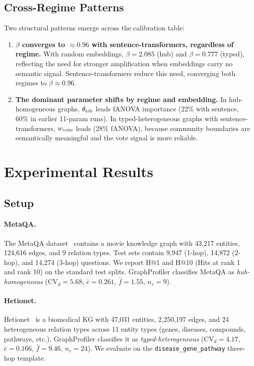 \documentclass[11pt,a4paper]{article}
\begin{document}
\subsection{Cross-Regime Patterns}

Two structural patterns emerge across the calibration table:

\begin{enumerate}
  \item \textbf{$\beta$ converges to $\approx 0.96$ with sentence-transformers,
    regardless of regime.}
    With random embeddings, $\beta = 2.085$ (hub) and $\beta = 0.777$ (typed),
    reflecting the need for stronger amplification when embeddings carry no
    semantic signal.
    Sentence-transformers reduce this need, converging both regimes to $\beta \approx 0.96$.

  \item \textbf{The dominant parameter shifts by regime and embedding.}
    In hub-homogeneous graphs, $\theta_{\rm trb}$ leads fANOVA importance
    (22\% with sentence, 60\% in earlier 11-param runs).
    In typed-heterogeneous graphs with sentence-transformers, $w_{\rm vote}$
    leads (28\% fANOVA), because community boundaries are semantically meaningful
    and the vote signal is more reliable.
\end{enumerate}

\section{Experimental Results}
\label{sec:results}

\subsection{Setup}

\paragraph{MetaQA.}
The MetaQA dataset~\cite{zhang2018variational} contains a movie knowledge
graph with 43,217 entities, 124,616 edges, and 9 relation types.
Test sets contain 9,947 (1-hop), 14,872 (2-hop), and 14,274 (3-hop)
questions.
We report H@1 and H@10 (Hits at rank 1 and rank 10) on the standard
test splits.
GraphProfiler classifies MetaQA as \textit{hub-homogeneous}
($\text{CV}_d = 5.68$, $\bar{c} = 0.261$, $\bar{f} = 1.55$, $n_r = 9$).

\paragraph{Hetionet.}
Hetionet~\cite{himmelstein2017systematic} is a biomedical KG with
47,031 entities, 2,250,197 edges, and 24 heterogeneous relation types
across 11 entity types (genes, diseases, compounds, pathways, etc.).
GraphProfiler classifies it as \textit{typed-heterogeneous}
($\text{CV}_d = 4.17$, $\bar{c} = 0.166$, $\bar{f} = 9.46$, $n_r = 24$).
We evaluate on the \texttt{disease\_gene\_pathway} three-hop template.
\end{document}
